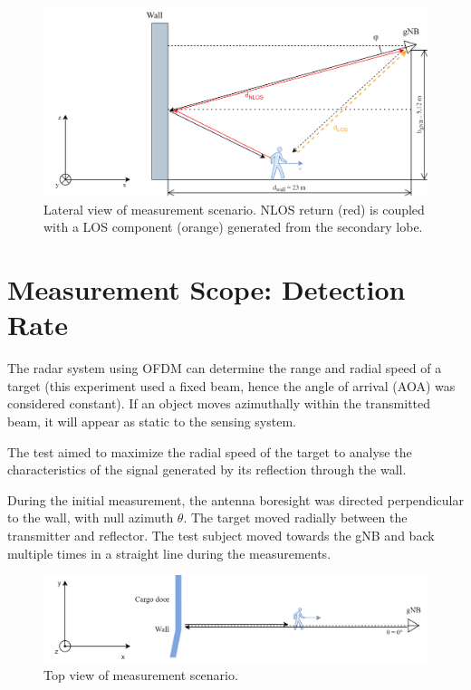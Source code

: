 \begin{figure}[H]
	\centering
	\includegraphics[width=1\textwidth]{Images/Test1/base-lateral_view_los_geometry}
	\caption{\small Lateral view of measurement scenario. NLOS return (red) is coupled with a LOS component (orange) generated from the secondary lobe.}
	\label{fig:Test1_base-lateral_view}
\end{figure}

\section{Measurement Scope: Detection Rate}

The radar system using OFDM can determine the range and radial speed of a target (this experiment used a fixed beam, hence the angle of arrival (AOA) was considered constant). If an object moves azimuthally within the transmitted beam, it will appear as static to the sensing system.

The test aimed to maximize the radial speed of the target to analyse the characteristics of the signal generated by its reflection through the wall.

During the initial measurement, the antenna boresight was directed perpendicular to the wall, with null azimuth $\theta$.
The target moved radially between the transmitter and reflector. The test subject moved towards the gNB and back multiple times in a straight line during the measurements.

\begin{figure}[H]
	\centering
	\includegraphics[width=1\textwidth]{Images/Test1/base-top_view}
	\caption{\small Top view of measurement scenario.}
	\label{fig:Test1_base-top_view}
\end{figure}


